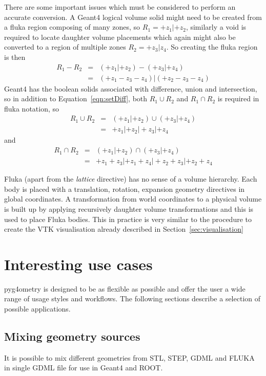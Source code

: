\documentclass[final,5p,times,twocolumn]{elsarticle}
\begin{document}
There are some important issues which must be considered to perform an accurate conversion. 
A Geant4 logical volume solid might need to be created from a fluka region composing of many zones, 
so $R_1 = +z_1 | +z_2$, similarly a void is required to locate daughter volume placements which again 
might also be converted to a region of multiple zones $R_2= +z_3| z_4$. So creating the fluka region is then 
\begin{eqnarray}
R_1 - R_2 	& = & (+z_1 | +z_2) - ( +z_3 | +z_4) 			\\
			& = & (+z_1 - z_3 - z_4)  | (+z_2 - z_3 - z_4)	
\label{eqn:setDiff}
\end{eqnarray}
Geant4 has the boolean solids associated with difference, union and intersection, so in addition to Equation~\ref{eqn:setDiff}, both $R_1 \cup R_2$ and 
$R_1 \cap R_2$ is required in fluka notation, so 
\begin{eqnarray}
R_1 \cup R_2 	& = & (+z_1 | +z_2)  \cup ( +z_3 | +z_4) \\
			& = & +z_1 | +z_2 |  +z_3 | +z_4
\end{eqnarray}
and 
\begin{eqnarray}
R_1 \cap R_2 	& = & (+z_1 | +z_2) \cap ( +z_3 | +z_4) \\
			& = & +z_1 +z_3  | +z_1 +z_4 | +z_2 +z_3 | +z_2 +z_4
\end{eqnarray}

Fluka (apart from the {\it lattice} directive) has no sense of a volume hierarchy. Each body is placed with a translation, rotation, expansion geometry 
directives in global coordinates. A transformation from world coordinates to a physical volume is built up by applying recursively daughter volume transformations and 
this is used to place Fluka bodies. This  in practice is very similar to the procedure to create the VTK visualisation already described in Section~\ref{sec:visualisation}

\section{Interesting use cases}
pyg4ometry is designed to be as flexible as possible and offer the user a wide range of usage styles and workflows. The following sections describe a selection of 
possible applications.

\subsection{Mixing geometry sources}
It is possible to mix different geometries from STL, STEP, GDML and FLUKA in single GDML file for use in Geant4 and ROOT. 
\end{document}
